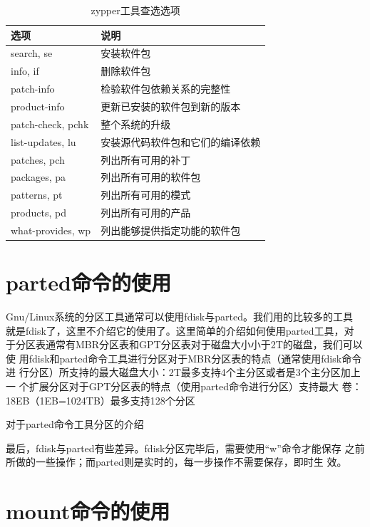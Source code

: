 \begin{table}[!h]
  \centering
    \begin{tabular}{ll}
      \toprule
      选项              & 说明 \\
      \midrule
      search, se        & 安装软件包 \\
      info, if          & 删除软件包 \\
      patch-info        & 检验软件包依赖关系的完整性 \\
      product-info      & 更新已安装的软件包到新的版本 \\
      patch-check, pchk & 整个系统的升级 \\
      list-updates, lu  & 安装源代码软件包和它们的编译依赖 \\
      patches, pch      & 列出所有可用的补丁 \\
      packages, pa      & 列出所有可用的软件包 \\
      patterns, pt      & 列出所有可用的模式 \\
      products, pd      & 列出所有可用的产品 \\
      what-provides, wp & 列出能够提供指定功能的软件包 \\
      \bottomrule
    \end{tabular}
    \caption{zypper工具查选选项}
\end{table}

\section{parted命令的使用}
\label{sec:PartedCmd}

Gnu/Linux系统的分区工具通常可以使用fdisk与parted。我们用的比较多的工具
就是fdisk了，这里不介绍它的使用了。这里简单的介绍如何使用parted工具，对
于分区表通常有MBR分区表和GPT分区表对于磁盘大小小于2T的磁盘，我们可以使
用fdisk和parted命令工具进行分区对于MBR分区表的特点（通常使用fdisk命令进
行分区）所支持的最大磁盘大小：2T最多支持4个主分区或者是3个主分区加上一
个扩展分区对于GPT分区表的特点（使用parted命令进行分区）支持最大
卷：18EB（1EB=1024TB）最多支持128个分区

对于parted命令工具分区的介绍

最后，fdisk与parted有些差异。fdisk分区完毕后，需要使用“w”命令才能保存
之前所做的一些操作；而parted则是实时的，每一步操作不需要保存，即时生
效。

\section{mount命令的使用}
\label{sec:mountCmd}

